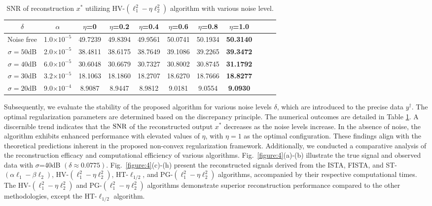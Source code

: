 \documentclass[a4paper,12pt]{article}
\numberwithin{equation}{section}
\begin{document}
\begin{table}[H]
\caption{{\rm SNR} of reconstruction $x^{*}$  utilizing HV-$\left(\ell_{1}^{2}-\eta\ell_{2}^{2}\right)$ algorithm with various noise level.}
\label{table:2}
\centering
\tabcolsep=0.35cm
\linewidth
\begin{tabular}{ccccccccccc}
\hline
$\delta$ & $\alpha$ & \multicolumn{1}{c}{$\eta$=0} & \multicolumn{1}{c}{$\eta$=0.2} & \multicolumn{1}{c}{$\eta$=0.4} & \multicolumn{1}{c}{$\eta$=0.6} & \multicolumn{1}{c}{$\eta$=0.8} & \multicolumn{1}{c}{$\eta$=1.0} \\
\hline
Noise free & 1.0$\times 10^{-5}$ & 49.7239 & 49.8394 & 49.9561 & 50.0741 & 50.1934 & \textbf{50.3140} \\
$\sigma=50$dB & 2.0$\times 10^{-5}$ & 38.4811 & 38.6175 & 38.7649 & 39.1086 & 39.2265 & \textbf{39.3472} \\
$\sigma=40$dB & 6.0$\times 10^{-5}$ & 30.6048 & 30.6679 & 30.7327 & 30.8002 & 30.8745 & \textbf{31.1792} \\
$\sigma=30$dB & 3.2$\times 10^{-5}$ & 18.1063 & 18.1860 & 18.2707 & 18.6270 & 18.7666 & \textbf{18.8277} \\
$\sigma=20$dB & 9.0$\times 10^{-4}$ & 8.9087 & 8.9447 & 8.9812 & 9.0181 & 9.0554 & \textbf{9.0930} \\
\hline
\end{tabular}
\end{table}

\par Subsequently, we evaluate the stability of the proposed algorithm for various noise levels $\delta$, which are introduced to the precise data $y^{\dagger}$. The optimal regularization parameters are determined based on the discrepancy principle. The numerical outcomes are detailed in Table \ref{table:2}. A discernible trend indicates that the ${\rm SNR}$ of the reconstructed output $x^{*}$ decreases as the noise levels increase. In the absence of noise, the algorithm exhibits enhanced performance with elevated values of $\eta$, with $\eta=1$ as the optimal configuration. These findings align with the theoretical predictions inherent in the proposed non-convex regularization framework. Additionally, we conducted a comparative analysis of the reconstruction efficacy and computational efficiency of various algorithms. Fig.\ \ref{figure:4}(a)-(b) illustrate the true signal and observed data with $\sigma$=40dB $\left(\delta\approx 0.0775\right)$. Fig.\ \ref{figure:4}(c)-(h) present the reconstructed signals derived from the ISTA, FISTA, and ST-$\left(\alpha\ell_{1}-\beta\ell_{2}\right)$, HV-$\left(\ell_{1}^{2}-\eta\ell_{2}^{2}\right)$, HT-$\ell_{1/2}$, and PG-$\left(\ell_{1}^{2}-\eta\ell_{2}^{2}\right)$ algorithms, accompanied by their respective computational times. The HV-$\left(\ell_{1}^{2}-\eta\ell_{2}^{2}\right)$ and PG-$\left(\ell_{1}^{2}-\eta\ell_{2}^{2}\right)$ algorithms demonstrate superior reconstruction performance compared to the other methodologies, except the HT-$\ell_{1/2}$ algorithm. 
\end{document}
